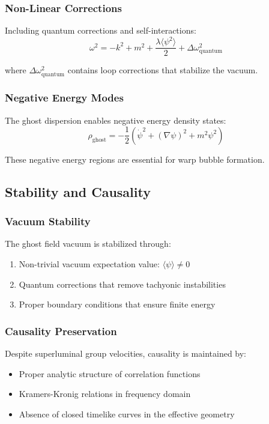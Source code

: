 \subsubsection{Non-Linear Corrections}

Including quantum corrections and self-interactions:
\begin{equation}
\omega^2 = -k^2 + m^2 + \frac{\lambda \langle \psi^2 \rangle}{2} + \Delta\omega^2_{\text{quantum}}
\end{equation}

where $\Delta\omega^2_{\text{quantum}}$ contains loop corrections that stabilize the vacuum.

\subsubsection{Negative Energy Modes}

The ghost dispersion enables negative energy density states:
\begin{equation}
\rho_{\text{ghost}} = -\frac{1}{2}\left(\dot{\psi}^2 + (\nabla\psi)^2 + m^2\psi^2\right)
\end{equation}

These negative energy regions are essential for warp bubble formation.

\subsection{Stability and Causality}

\subsubsection{Vacuum Stability}

The ghost field vacuum is stabilized through:
\begin{enumerate}
\item Non-trivial vacuum expectation value: $\langle \psi \rangle \neq 0$
\item Quantum corrections that remove tachyonic instabilities
\item Proper boundary conditions that ensure finite energy
\end{enumerate}

\subsubsection{Causality Preservation}

Despite superluminal group velocities, causality is maintained by:
\begin{itemize}
\item Proper analytic structure of correlation functions
\item Kramers-Kronig relations in frequency domain
\item Absence of closed timelike curves in the effective geometry
\end{itemize}

